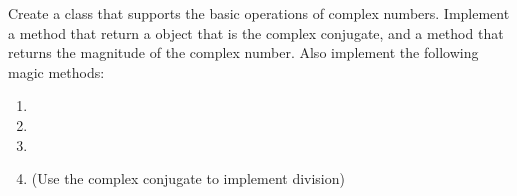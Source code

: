 \begin{problem}
Create a  class that supports the basic operations of complex numbers. Implement a  method that return a  object that is the complex conjugate, and a  method that returns the magnitude of the complex number.
Also implement the following magic methods:
\begin{enumerate}
\item {}
\item {}
\item {}
\item {} (Use the complex conjugate to implement division)
\end{enumerate}
\end{problem}
